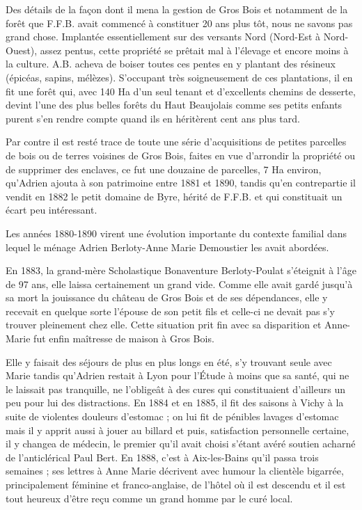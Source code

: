 \documentclass[11pt,a4paper]{report}
\begin{document}
Des détails de la façon dont il mena la gestion de Gros Bois et notamment de la forêt que F.F.B. avait commencé à constituer 20 ans plus tôt, nous ne savons pas grand chose. Implantée essentiellement sur des versants Nord (Nord-Est à Nord-Ouest), assez pentus, cette propriété se prêtait mal à l'élevage et encore moins à la culture. A.B. acheva de boiser toutes ces pentes en y plantant des résineux (épicéas, sapins, mélèzes). S'occupant très soigneusement de ces plantations, il en fit une forêt qui, avec 140 Ha d'un seul tenant et d'excellents chemins de desserte, devint l'une des plus belles forêts du Haut Beaujolais comme ses petits enfants purent s'en rendre compte quand ils en héritèrent cent ans plus tard.

Par contre il est resté trace de toute une série d'acquisitions de petites parcelles de bois ou de terres voisines de Gros Bois, faites en vue d'arrondir la propriété ou de supprimer des enclaves, ce fut une douzaine de parcelles, 7 Ha environ, qu'Adrien ajouta à son patrimoine entre 1881 et 1890, tandis qu'en contrepartie il vendit en 1882 le petit domaine de Byre, hérité de F.F.B. et qui constituait un écart peu intéressant.

Les années 1880-1890 virent une évolution importante du contexte familial dans lequel le ménage Adrien Berloty-Anne Marie Demoustier les avait abordées.

En 1883, la grand-mère Scholastique Bonaventure Berloty-Poulat s'éteignit à l'âge de 97 ans, elle laissa certainement un grand vide. Comme elle avait gardé jusqu'à sa mort la jouissance du château de Gros Bois et de ses dépendances, elle y recevait en quelque sorte l'épouse de son petit fils et celle-ci ne devait pas s'y trouver pleinement chez elle. Cette situation prit fin avec sa disparition et Anne-Marie fut enfin maîtresse de maison à Gros Bois.


Elle y faisait des séjours de plus en plus longs en été, s'y trouvant seule avec Marie tandis qu'Adrien restait à Lyon pour l'Étude à moins que sa santé, qui ne le laissait pas tranquille, ne l'obligeât à des cures qui constituaient d'ailleurs un peu pour lui des distractions. En 1884 et en 1885, il fit des saisons à Vichy à la suite de violentes douleurs d'estomac ; on lui fit de pénibles lavages d'estomac mais il y apprit aussi à jouer au billard et puis, satisfaction personnelle certaine, il y changea de médecin, le premier qu'il avait choisi s'étant avéré soutien acharné de l'anticlérical Paul Bert. En 1888, c'est à Aix-les-Bains qu'il passa trois semaines ; ses lettres à Anne Marie décrivent avec humour la clientèle bigarrée, principalement féminine et franco-anglaise, de l'hôtel où il est descendu et il est tout heureux d'être reçu comme un grand homme par le curé local.
\end{document}
